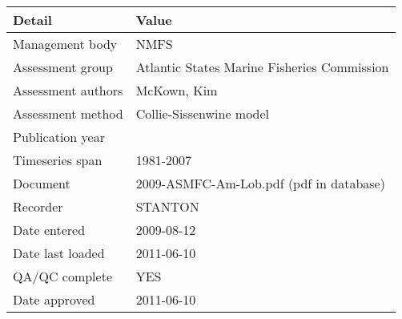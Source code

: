 \begin{table}[htb]
\centering
\begin{tabular}{lp{7cm}}
\toprule
Detail & Value \\
\midrule
Management body    & NMFS                                        \\
Assessment group   & Atlantic States Marine Fisheries Commission \\
Assessment authors & McKown, Kim                                 \\
Assessment method  & Collie-Sissenwine model                     \\
Publication year   &                                             \\
Timeseries span    & 1981-2007                                   \\
Document           & 2009-ASMFC-Am-Lob.pdf (pdf in database)     \\
Recorder           & STANTON                                     \\
Date entered       & 2009-08-12                                  \\
Date last loaded   & 2011-06-10                                  \\
QA/QC complete     & YES                                         \\
Date approved      & 2011-06-10                                  \\
\bottomrule
\end{tabular}
\label{tab:assessdet}
\end{table}
